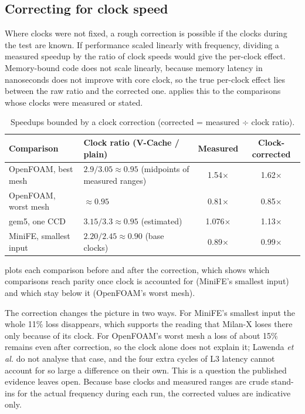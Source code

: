 \subsection{Correcting for clock speed}
\label{sec:clock-correction}
Where clocks were not fixed, a rough correction is possible if the clocks during the test are known. If performance scaled linearly with frequency, dividing a measured speedup by the ratio of clock speeds would give the per-clock effect. Memory-bound code does not scale linearly, because memory latency in nanoseconds does not improve with core clock, so the true per-clock effect lies between the raw ratio and the corrected one.  applies this to the comparisons whose clocks were measured or stated.

\begin{table}[htbp]
  \centering
  \caption[Speedups bounded by a clock correction]{Speedups bounded by a clock correction (corrected = measured $\div$ clock ratio).}
  \label{tab:clock-correction}
  \small
  \begin{tabularx}{\textwidth}{@{}>{\raggedright\arraybackslash}X>{\raggedright\arraybackslash}p{3.2cm}cc@{}}
    \toprule
    \textbf{Comparison} & \textbf{Clock ratio (V-Cache / plain)} & \textbf{Measured} & \textbf{Clock-corrected} \\
    \midrule
    OpenFOAM, best mesh \cite{lawendaEvaluatingImpactL32025} & $2.9/3.05 \approx 0.95$ (midpoints of measured ranges) & 1.54$\times$ & 1.62$\times$ \\
    OpenFOAM, worst mesh \cite{lawendaEvaluatingImpactL32025} & $\approx 0.95$ & 0.81$\times$ & 0.85$\times$ \\
    gem5, one CCD \cite{cozmaDeepDivingZen2022} & $3.15/3.3 \approx 0.95$ (estimated) & 1.076$\times$ & 1.13$\times$ \\
    MiniFE, smallest input \cite{domkeLocusPerformanceQuantifying2023} & $2.20/2.45 \approx 0.90$ (base clocks) & 0.89$\times$ & 0.99$\times$ \\
    \bottomrule
  \end{tabularx}
\end{table}
 plots each comparison before and after the correction, which shows which comparisons reach parity once clock is accounted for (MiniFE's smallest input) and which stay below it (OpenFOAM's worst mesh).




The correction changes the picture in two ways. For MiniFE's smallest input the whole 11\% loss disappears, which supports the reading that Milan-X loses there only because of its clock. For OpenFOAM's worst mesh a loss of about 15\% remains even after correction, so the clock alone does not explain it; Lawenda \emph{et al.} do not analyse that case, and the four extra cycles of L3 latency cannot account for so large a difference on their own. This is a question the published evidence leaves open. Because base clocks and measured ranges are crude stand-ins for the actual frequency during each run, the corrected values are indicative only.


